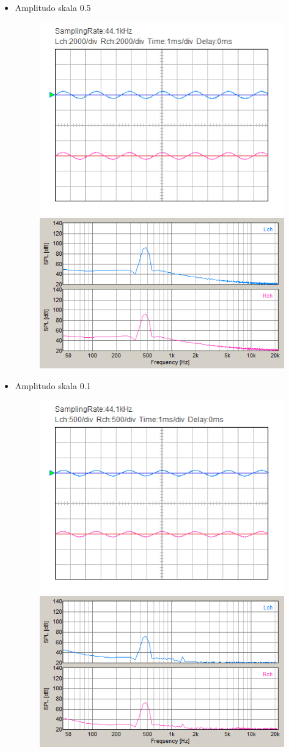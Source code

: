 \documentclass[12pt,]{article}
\begin{document}
\begin{itemize}
\begin{itemize}
			\item Amplitudo skala 0.5
			\begin{figure}[H]
				\centering
				\includegraphics[width=0.45\linewidth]{result/day_4/500Hz/tone05}
				\includegraphics[width=0.45\linewidth]{result/day_4/500Hz/fft_tone05}
			\end{figure}
		
			\item Amplitudo skala 0.1
			\begin{figure}[H]
				\centering
				\includegraphics[width=0.45\linewidth]{result/day_4/500Hz/tone01}
				\includegraphics[width=0.45\linewidth]{result/day_4/500Hz/fft_tone01}
			\end{figure}
			

\end{itemize}
\end{itemize}
\end{document}
